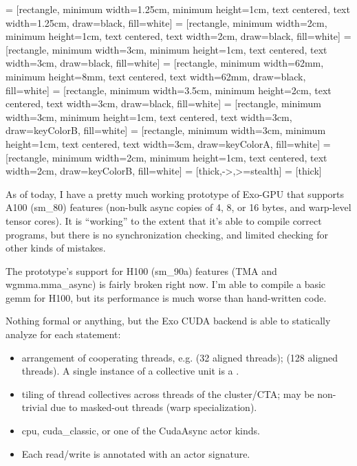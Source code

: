 

 = [rectangle, minimum width=1.25cm, minimum height=1cm, text centered, text width=1.25cm, draw=black, fill=white]
 = [rectangle, minimum width=2cm, minimum height=1cm, text centered, text width=2cm, draw=black, fill=white]
 = [rectangle, minimum width=3cm, minimum height=1cm, text centered, text width=3cm, draw=black, fill=white]
 = [rectangle, minimum width=62mm, minimum height=8mm, text centered, text width=62mm, draw=black, fill=white]
 = [rectangle, minimum width=3.5cm, minimum height=2cm, text centered, text width=3cm, draw=black, fill=white]
 = [rectangle, minimum width=3cm, minimum height=1cm, text centered, text width=3cm, draw=keyColorB, fill=white]
 = [rectangle, minimum width=3cm, minimum height=1cm, text centered, text width=3cm, draw=keyColorA, fill=white]
 = [rectangle, minimum width=2cm, minimum height=1cm, text centered, text width=2cm, draw=keyColorB, fill=white]
 = [thick,->,>=stealth]
 = [thick]



As of today, I have a pretty much working prototype of Exo-GPU that supports A100 (sm\_80) features (non-bulk async copies of 4, 8, or 16 bytes, and warp-level tensor cores).
It is ``working'' to the extent that it's able to compile correct programs, but there is no synchronization checking, and limited checking for other kinds of mistakes.

The prototype's support for H100 (sm\_90a) features (TMA and wgmma.mma\_async) is fairly broken right now.
I'm able to compile a basic gemm for H100, but its performance is much worse than hand-written code.

\filbreak
{}

 Nothing formal or anything, but the Exo CUDA backend is able to statically analyze for each statement:
\begin{itemize}
  \item {} arrangement of cooperating threads, e.g.  (32 aligned threads);  (128 aligned threads).
  A single instance of a collective unit is a .
  \item {} tiling of thread collectives across threads of the cluster/CTA; may be non-trivial due to masked-out threads (warp specialization).
  \item {} cpu, cuda\_classic, or one of the CudaAsync actor kinds.
  \item {} Each read/write is annotated with an actor signature.
\end{itemize}

